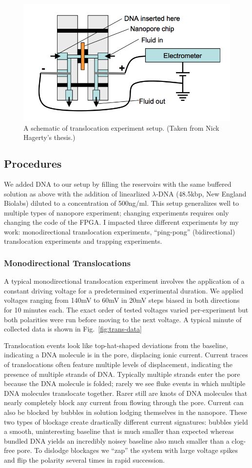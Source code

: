 \documentclass[aps,prl,preprint,groupedaddress]{revtex4}
\begin{document}
\begin{figure}
\centering
\includegraphics[width=.6\textwidth]{figures/chuck}
\caption{A schematic of translocation experiment setup. (Taken from Nick Hagerty's thesis.)}
\label{fig:chuck}
\end{figure}

\subsection{Procedures}

We added DNA to our setup by filling the reservoirs with the same buffered solution as above with the addition of linearlized $\lambda$-DNA (48.5kbp, New England Biolabs) diluted to a concentration of 500ng/ml.
This setup generalizes well to multiple types of nanopore experiment; changing experiments requires only changing the code of the FPGA.
I impacted three different experiments by my work: monodirectional translocation experiments, ``ping-pong'' (bidirectional) translocation experiments and trapping experiments.

\subsubsection{Monodirectional Translocations}

A typical monodirectional translocation experiment involves the application of a constant driving voltage for a predetermined experimental duration.
We applied voltages ranging from 140mV to 60mV in 20mV steps biased in both directions for 10 minutes each.
The exact order of tested voltages varied per-experiment but both polarities were run before moving to the next voltage.
A typical minute of collected data is shown in Fig.~\ref{fig:trans-data}

Translocation events look like top-hat-shaped deviations from the baseline, indicating a DNA molecule is in the pore, displacing ionic current.
Current traces of translocations often feature multiple levels of displacement, indicating the presence of multiple strands of DNA.
Typically multiple strands enter the pore because the DNA molecule is folded; rarely we see fluke events in which multiple DNA molecules translocate together.
Rarer still are knots of DNA molecules that nearly completely block any current from flowing through the pore.
Current can also be blocked by bubbles in solution lodging themselves in the nanopore.
These two types of blockage create drastically different current signatures: bubbles yield a smooth, uninteresting baseline that is much smaller than expected whereas bundled DNA yields an incredibly noisey baseline also much smaller than a clog-free pore.
To dislodge blockages we ``zap'' the system with large voltage spikes and flip the polarity several times in rapid succession.
\end{document}
